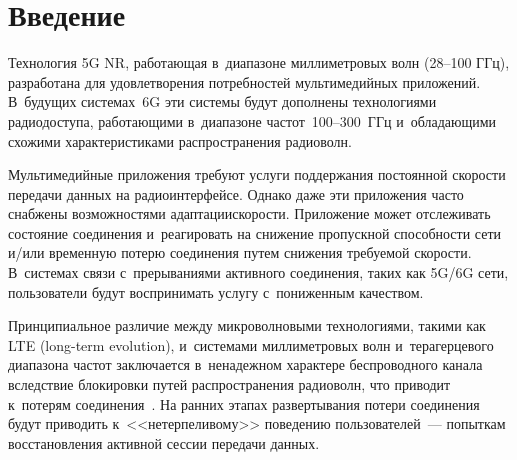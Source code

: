 
  
\vspace*{-2pt}



\thispagestyle{headings}

\begin{multicols}{2}

\label{st\stat}
    
\section{Введение}



Технология 5G NR, ра\-бо\-та\-ющая в~диапазоне мил\-ли\-мет\-ро\-вых 
волн (28--100 ГГц), разработана для удовле\-тво\-ре\-ния потребностей мультимедийных 
приложений. В~будущих сис\-те\-мах~6G эти сис\-те\-мы будут дополнены технологиями 
радиодоступа, ра\-бо\-та\-ющи\-ми в~диапазоне час\-тот~100--300~ГГц и~об\-ла\-да\-ющи\-ми схожими 
характеристиками распространения ра\-дио\-волн.

Мультимедийные приложения требуют услуги поддержания по\-сто\-ян\-ной ско\-рости 
передачи данных на радиоинтерфейсе. Однако даже эти приложения час\-то снабжены 
возможностями адап\-та\-ции\linebreak ско\-рости. Приложение может отслеживать со\-сто\-яние 
со\-еди\-не\-ния и~реагировать на снижение пропускной спо\-соб\-ности сети и/или временную 
потерю соединения путем снижения тре\-бу\-емой \mbox{ско\-рости}. В~сис\-те\-мах связи 
с~прерываниями активного со\-еди\-не\-ния, таких как 5G/6G сети, пользователи будут 
воспринимать услугу с~пониженным качеством.

Принципиальное различие между микроволновыми технологиями, такими как LTE (long-term evolution), 
и~сис\-те\-ма\-ми мил\-ли\-мет\-ро\-вых волн и~терагерцевого диапазона час\-тот заключается 
в~не\-на\-деж\-ном характере беспроводного канала вследствие блокировки путей 
рас\-про\-стра\-не\-ния радиоволн, что приводит к~потерям соединения~\cite{begishev2021joint}. 
На ранних этапах развертывания потери со\-еди\-не\-ния будут 
приводить к~<<нетерпеливому>> поведению пользователей~--- попыткам вос\-ста\-нов\-ле\-ния 
активной сессии передачи данных. 


\end{multicols}
